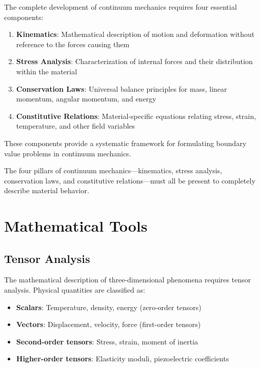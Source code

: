 The complete development of continuum mechanics requires four essential components:

\begin{enumerate}
\item \textbf{Kinematics}: Mathematical description of motion and deformation without reference to the forces causing them
\item \textbf{Stress Analysis}: Characterization of internal forces and their distribution within the material
\item \textbf{Conservation Laws}: Universal balance principles for mass, linear momentum, angular momentum, and energy
\item \textbf{Constitutive Relations}: Material-specific equations relating stress, strain, temperature, and other field variables
\end{enumerate}

These components provide a systematic framework for formulating boundary value problems in continuum mechanics.

\begin{keypoint}
The four pillars of continuum mechanics—kinematics, stress analysis, conservation laws, and constitutive relations—must all be present to completely describe material behavior.
\end{keypoint}

\section{Mathematical Tools}

\subsection{Tensor Analysis}

The mathematical description of three-dimensional phenomena requires tensor analysis. Physical quantities are classified as:
\begin{itemize}
\item \textbf{Scalars}: Temperature, density, energy (zero-order tensors)
\item \textbf{Vectors}: Displacement, velocity, force (first-order tensors)
\item \textbf{Second-order tensors}: Stress, strain, moment of inertia
\item \textbf{Higher-order tensors}: Elasticity moduli, piezoelectric coefficients
\end{itemize}

